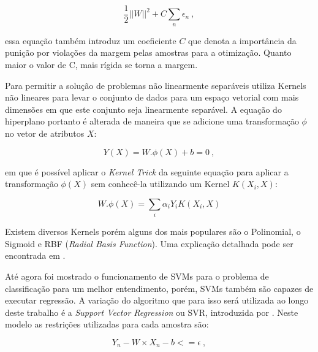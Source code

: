 \documentclass[12pt]{article}
\begin{document}
            \begin{equation} 
            \label{eq:svmSlack}
            \frac{1}{2}||W||^2 + C\sum_n{\epsilon_{n}}~,
            \end{equation}
            
            \noindent essa equação também introduz um coeficiente $C$ que denota a importância da punição por violações da margem pelas amostras para a otimização. Quanto maior o valor de C, mais rígida se torna a margem.
            
            Para permitir a solução de problemas não linearmente separáveis \cite{svm1992} utiliza Kernels não lineares para levar o conjunto de dados para um espaço vetorial com mais dimensões em que este conjunto seja linearmente separável. A equação do hiperplano portanto é alterada de maneira que se adicione uma transformação $\phi$ no vetor de atributos $X$:
            
            \begin{equation} 
            \label{eq:svmTransformation}
            Y(X) = W.\phi(X) + b = 0~,
            \end{equation}
            
            \noindent em que é possível aplicar o \textit{Kernel Trick} da seguinte equação para aplicar a transformação $\phi(X)$ sem conhecê-la utilizando um Kernel $K(X_i, X)$: 
            
            \begin{equation} 
            \label{eq:svmKernelTrick}
            W.\phi(X) = \sum_{i}{\alpha_{i}Y_{i}K(X_i, X) }
            \end{equation}
            
            Existem diversos Kernels porém alguns dos mais populares são o Polinomial, o Sigmoid e RBF (\textit{Radial Basis Function}). Uma explicação detalhada pode ser encontrada em \cite{patternRecognition1997}.
            
            Até agora foi mostrado o funcionamento de SVMs para o problema de classificação para um melhor entendimento, porém, SVMs também são capazes de executar regressão. A variação do algoritmo que para isso será utilizada ao longo deste trabalho é a \textit{Support Vector Regression} ou SVR, introduzida por \cite{svr1997}. Neste modelo as restrições utilizadas para cada amostra são:
            
            \begin{equation} 
            \label{eq:svrRestriction1}
            Y_n - W \times X_n - b <= \epsilon ~,
            \end{equation}
            
\end{document}
